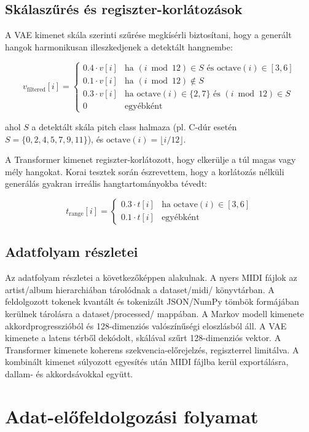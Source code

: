 \subsection{Skálaszűrés és regiszter-korlátozások}

A VAE kimenet skála szerinti szűrése megkísérli biztosítani, hogy a generált hangok harmonikusan illeszkedjenek a detektált hangnembe:

\[
v_{\text{filtered}}[i] = \begin{cases}
0.4 \cdot v[i] & \text{ha } (i \bmod 12) \in S \text{ és octave}(i) \in [3,6] \\
0.1 \cdot v[i] & \text{ha } (i \bmod 12) \notin S \\
0.3 \cdot v[i] & \text{ha octave}(i) \in \{2,7\} \text{ és } (i \bmod 12) \in S \\
0 & \text{egyébként}
\end{cases}
\]

ahol $S$ a detektált skála pitch class halmaza (pl. C-dúr esetén $S = \{0,2,4,5,7,9,11\}$), és $\text{octave}(i) = \lfloor i/12 \rfloor$.

A Transformer kimenet regiszter-korlátozott, hogy elkerülje a túl magas vagy mély hangokat. Korai tesztek során észrevettem, hogy a korlátozás nélküli generálás gyakran irreális hangtartományokba tévedt:

\[
t_{\text{range}}[i] = \begin{cases}
0.3 \cdot t[i] & \text{ha octave}(i) \in [3,6] \\
0.1 \cdot t[i] & \text{egyébként}
\end{cases}
\]

\subsection{Adatfolyam részletei}
Az adatfolyam részletei a következőképpen alakulnak. A nyers MIDI fájlok az artist/album hierarchiában tárolódnak a dataset/midi/ könyvtárban. A feldolgozott tokenek kvantált és tokenizált JSON/NumPy tömbök formájában kerülnek tárolásra a dataset/processed/ mappában. A Markov modell kimenete akkordprogresszióból és 128-dimenziós valószínűségi eloszlásból áll. A VAE kimenete a latens térből dekódolt, skálával szűrt 128-dimenziós vektor. A Transformer kimenete koherens szekvencia-előrejelzés, regiszterrel limitálva. A kombinált kimenet súlyozott egyesítés után MIDI fájlba kerül exportálásra, dallam- és akkordsávokkal együtt.

\section{Adat-előfeldolgozási folyamat}

